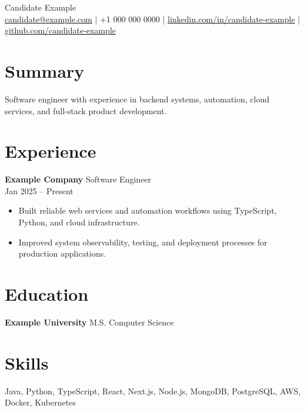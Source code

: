 \documentclass[10pt]{article}
\begin{document}
\begin{center}
{\LARGE Candidate Example}\\
\href{mailto:candidate@example.com}{candidate@example.com} |
+1 000 000 0000 |
\href{https://www.linkedin.com/in/candidate-example}{linkedin.com/in/candidate-example} |
\href{https://github.com/candidate-example}{github.com/candidate-example}
\end{center}

\section*{Summary}
Software engineer with experience in backend systems, automation, cloud services, and full-stack product development.

\section*{Experience}
\textbf{Example Company} \hfill Software Engineer \\
Jan 2025 -- Present
\begin{itemize}
  \item Built reliable web services and automation workflows using TypeScript, Python, and cloud infrastructure.
  \item Improved system observability, testing, and deployment processes for production applications.
\end{itemize}

\section*{Education}
\textbf{Example University} \hfill M.S. Computer Science

\section*{Skills}
Java, Python, TypeScript, React, Next.js, Node.js, MongoDB, PostgreSQL, AWS, Docker, Kubernetes
\end{document}
